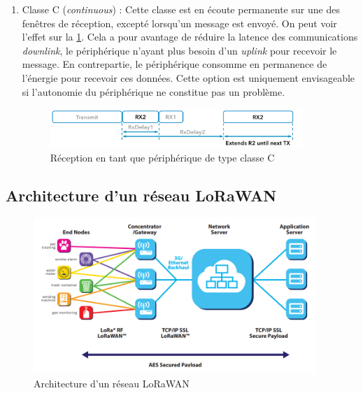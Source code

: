 \begin{enumerate}
    
    \item Classe C (\textit{continuous}) : Cette classe est en écoute permanente sur une des fenêtres de réception, excepté lorsqu'un message est envoyé. On peut voir l'effet sur la \cref{fig-class_c_rx}. Cela a pour avantage de réduire la latence des communications \textit{downlink}, le périphérique n'ayant plus besoin d'un \textit{uplink} pour recevoir le message. En contrepartie, le périphérique consomme en permanence de l'énergie pour recevoir ces données. Cette option est uniquement envisageable si l'autonomie du périphérique ne constitue pas un problème.
    
\begin{figure}[ht!]
    \centering
    \includegraphics[width=0.9\textwidth]{Figures/Protocols/LoRaWAN/class_c_rx.png}
    \caption{Réception en tant que périphérique de type classe C}
    \label{fig-class_c_rx}
\end{figure}
\end{enumerate}



\subsection{Architecture d'un réseau LoRaWAN}
\label{sec-protocols_lorawan_architecture}


\begin{figure}[ht!]
    \centering
    \includegraphics[width=0.95\textwidth]{Figures/Protocols/LoRaWAN/lorawan_archtecture.png}
    \caption{Architecture d'un réseau LoRaWAN}
    \label{fig-lorawan_archtecture}
\end{figure}

